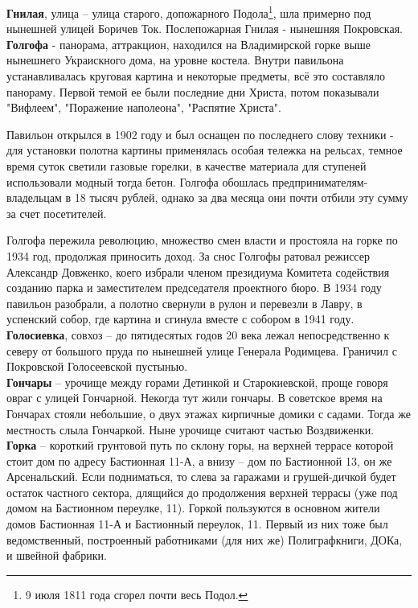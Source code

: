 \textbf{Гнилая}, улица – улица старого, допожарного Подола\footnote{9 июля 1811 года сгорел почти весь Подол.}, шла примерно под нынешней улицей Боричев Ток. Послепожарная Гнилая - нынешняя Покровская.\\

\textbf{Голгофа} - панорама, аттракцион, находился на Владимирской горке выше нынешнего Украискного дома, на уровне костела. Внутри павильона устанавливалась круговая картина и некоторые предметы, всё это составляло панораму. Первой темой ее были последние дни Христа, потом показывали "Вифлеем", "Поражение наполеона", "Распятие Христа".

    Павильон открылся в 1902 году и был оснащен по последнего слову техники - для установки полотна картины применялась особая тележка на рельсах, темное время суток светили газовые горелки, в качестве материала для ступеней использовали модный тогда бетон. Голгофа обошлась предпринимателям-владельцам в 18 тысяч рублей, однако за два месяца они почти отбили эту сумму за счет посетителей.

    Голгофа пережила революцию, множество смен власти и простояла на горке по 1934 год, продолжая приносить доход. За снос Голгофы ратовал режиссер Александр Довженко, коего избрали членом президиума Комитета содействия созданию парка и заместителем председателя проектного бюро. В 1934 году павильон разобрали, а полотно свернули в рулон и перевезли в Лавру, в успенский собор, где картина и сгинула вместе с собором в 1941 году.\\


\textbf{Голосиевка}, совхоз – до пятидесятых годов 20 века лежал непосредственно к северу от большого пруда по нынешней улице Генерала Родимцева. Граничил с Покровской Голосеевской пустынью.\\

\textbf{Гончары} – урочище между горами Детинкой и Старокиевской, проще говоря овраг с улицей Гончарной. Некогда тут жили гончары. В советское время на Гончарах стояли небольшие, о двух этажах кирпичные домики с садами. Тогда же местность слыла Гончаркой. Ныне урочище считают частью Воздвиженки.\\


\textbf{Горка} – короткий грунтовой путь по склону горы, на верхней террасе которой стоит дом по адресу Бастионная 11-А, а внизу – дом по Бастионной 13, он же Арсенальский. Если подниматься, то слева за гаражами и грушей-дичкой будет остаток частного сектора, длящийся до продолжения верхней террасы (уже под домом на Бастионном переулке, 11). Горкой пользуются в основном жители домов Бастионная 11-А и Бастионный переулок, 11. Первый из них тоже был ведомственный, построенный работниками (для них же) Полиграфкниги, ДОКа, и швейной фабрики.\\

